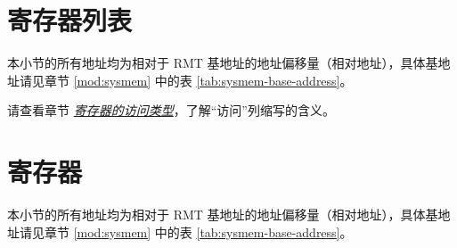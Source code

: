 \documentclass[main\_\_CN.tex]{subfiles}
\begin{document}


\clearpage
\section{寄存器列表}
\label{sec:rmt-reg-summ}
\hypertarget{rmt-reg-summ}{}

本小节的所有地址均为相对于 RMT 基地址的地址偏移量（相对地址），具体基地址请见章节 \ref{mod:sysmem} \textit{} 中的表 \ref{tab:sysmem-base-address}。

请查看章节 \hyperref[glossary-access-types]{\textit{寄存器的访问类型}}，了解“访问”列缩写的含义。







\section{寄存器}

本小节的所有地址均为相对于 RMT 基地址的地址偏移量（相对地址），具体基地址请见章节 \ref{mod:sysmem} \textit{} 中的表 \ref{tab:sysmem-base-address}。


\end{document}
